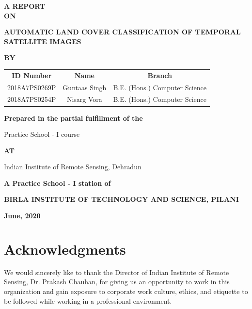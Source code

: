 \documentclass[12pt, a4paper]{report}
\begin{document}
\begin{titlepage}
\begin{doublespace}
\vspace*{0.3cm}
\begin{center} \textbf{A REPORT\\ON} \end{center}
\begin{center} \textbf{{\Large AUTOMATIC LAND COVER CLASSIFICATION OF TEMPORAL SATELLITE IMAGES}} \end{center}
\begin{center} \textbf{BY} \end{center}
\begin{center}
	\begin{tabular}{c c c}
		\textbf{ID Number} & \textbf{Name} & \textbf{Branch} \\
		2018A7PS0269P & Guntaas Singh & B.E. (Hons.) Computer Science \\
		2018A7PS0254P & Nisarg Vora  & B.E. (Hons.) Computer Science \\
	\end{tabular} 
\end{center}
\vspace{2cm}
\begin{center} \textbf{Prepared in the partial fulfillment of the} \end{center}
\begin{center} Practice School - I course \end{center}
\vspace{1.5cm}
\begin{center} \textbf{AT} \end{center}
\begin{center} {\Large Indian Institute of Remote Sensing, Dehradun} \end{center}
\begin{center} \textbf{A Practice School - I station of} \end{center}
\begin{center} {\textbf{BIRLA INSTITUTE OF TECHNOLOGY AND SCIENCE, PILANI}} \end{center}
\begin{center} \textbf{June, 2020} \end{center}
\end{doublespace}
\end{titlepage}
\pagebreak

\setcounter{secnumdepth}{0}
\section{Acknowledgments}
\pagestyle{plain}
\setcounter{page}{3}
We would sincerely like to thank the Director of Indian Institute of Remote Sensing, Dr. Prakash Chauhan, for giving us an opportunity to work in this organization and gain exposure to corporate work culture, ethics, and etiquette to be followed while working in a professional environment.
\end{document}
